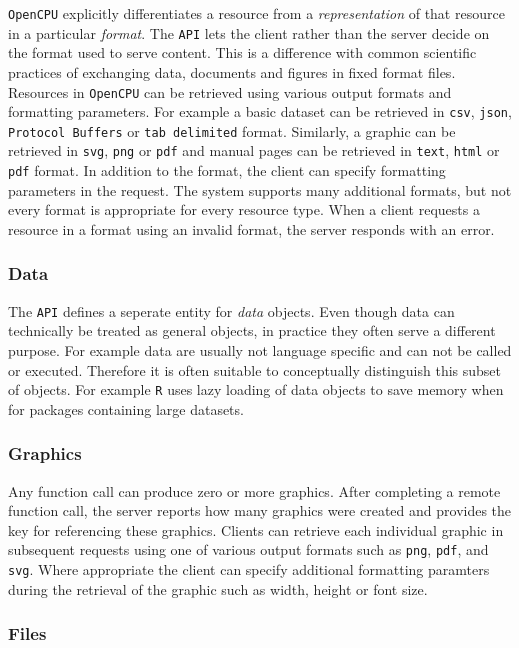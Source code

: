 \documentclass{article}
\newcommand{\R}{\texttt{R}\xspace}
\newcommand{\API}{\texttt{API}\xspace}
\newcommand{\OpenCPU}{\texttt{OpenCPU}\xspace}
\begin{document}
\OpenCPU explicitly differentiates a resource from a \emph{representation} of that resource in a particular \emph{format}. The \API lets the client rather than the server decide on the format used to serve content. This is a difference with common scientific practices of exchanging data, documents and figures in fixed format files. Resources in \OpenCPU can be retrieved using various output formats and formatting parameters. For example a basic dataset can be retrieved in \texttt{csv}, \texttt{json}, \texttt{Protocol Buffers} or \texttt{tab delimited} format. Similarly, a graphic can be retrieved in \texttt{svg}, \texttt{png} or \texttt{pdf} and manual pages can be retrieved in \texttt{text}, \texttt{html} or \texttt{pdf} format. In addition to the format, the client can specify formatting parameters in the request. The system supports many additional formats, but not every format is appropriate for every resource type. When a client requests a resource in a format using an invalid format, the server responds with an error.   


\subsubsection{Data}

The \API defines a seperate entity for \emph{data} objects. Even though data can technically be treated as general objects, in practice they often serve a different purpose. For example data are usually not language specific and can not be called or executed. Therefore it is often suitable to conceptually distinguish this subset of objects. For example \R uses lazy loading of data objects to save memory when for packages containing large datasets.

\subsubsection{Graphics}

Any function call can produce zero or more graphics. After completing a remote function call, the server reports how many graphics were created and provides the key for referencing these graphics. Clients can retrieve each individual graphic in subsequent requests using one of various output formats such as \texttt{png}, \texttt{pdf}, and \texttt{svg}. Where appropriate the client can specify additional formatting paramters during the retrieval of the graphic such as width, height or font size.

\subsubsection{Files}
\end{document}
